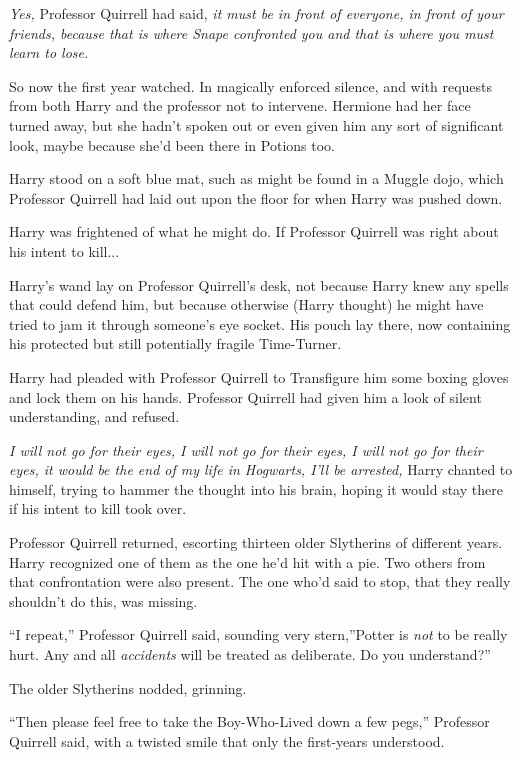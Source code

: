 \emph{Yes,} Professor Quirrell had said, \emph{it must be in front of
everyone, in front of your friends, because that is where Snape
confronted you and that is where you must learn to lose.}

So now the first year watched. In magically enforced silence, and with
requests from both Harry and the professor not to intervene. Hermione
had her face turned away, but she hadn't spoken out or even given him
any sort of significant look, maybe because she'd been there in Potions
too.

Harry stood on a soft blue mat, such as might be found in a Muggle dojo,
which Professor Quirrell had laid out upon the floor for when Harry was
pushed down.

Harry was frightened of what he might do. If Professor Quirrell was
right about his intent to kill...

Harry's wand lay on Professor Quirrell's desk, not because Harry knew
any spells that could defend him, but because otherwise (Harry thought)
he might have tried to jam it through someone's eye socket. His pouch
lay there, now containing his protected but still potentially fragile
Time-Turner.

Harry had pleaded with Professor Quirrell to Transfigure him some boxing
gloves and lock them on his hands. Professor Quirrell had given him a
look of silent understanding, and refused.

\emph{I will not go for their eyes, I will not go for their eyes, I will
not go for their eyes, it would be the end of my life in Hogwarts, I'll
be arrested,} Harry chanted to himself, trying to hammer the thought
into his brain, hoping it would stay there if his intent to kill took
over.

Professor Quirrell returned, escorting thirteen older Slytherins of
different years. Harry recognized one of them as the one he'd hit with a
pie. Two others from that confrontation were also present. The one who'd
said to stop, that they really shouldn't do this, was missing.

``I repeat,'' Professor Quirrell said, sounding very stern,''Potter is
\emph{not} to be really hurt. Any and all \emph{accidents} will be
treated as deliberate. Do you understand?''

The older Slytherins nodded, grinning.

``Then please feel free to take the Boy-Who-Lived down a few pegs,''
Professor Quirrell said, with a twisted smile that only the first-years
understood.

